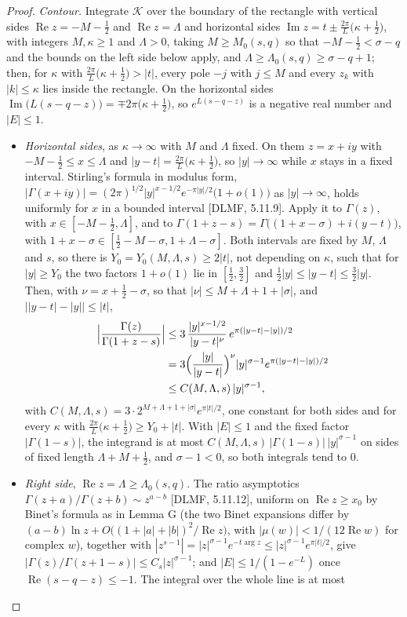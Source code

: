 \documentclass[11pt]{article}
\newcommand{\re}{\operatorname{Re}}
\newcommand{\im}{\operatorname{Im}}
\begin{document}
\begin{proof}
\emph{Contour.} Integrate $\mathcal{K}$ over the boundary of the rectangle with vertical sides $\re z=-M-\frac12$ and $\re z=\Lambda$ and horizontal sides $\im z=t\pm\frac{2\pi}{L}\bigl(\kappa+\frac12\bigr)$, with integers $M,\kappa\ge1$ and $\Lambda>0$, taking $M\ge M_0(s,q)$ so that $-M-\frac12<\sigma-q$ and the bounds on the left side below apply, and $\Lambda\ge\Lambda_0(s,q)\ge\sigma-q+1$; then, for $\kappa$ with $\frac{2\pi}{L}\bigl(\kappa+\frac12\bigr)>|t|$, every pole $-j$ with $j\le M$ and every $z_k$ with $|k|\le\kappa$ lies inside the rectangle. On the horizontal sides $\im\bigl(L(s-q-z)\bigr)=\mp2\pi\bigl(\kappa+\frac12\bigr)$, so $e^{L(s-q-z)}$ is a negative real number and $|E|\le1$.
\begin{itemize}
\item \emph{Horizontal sides}, as $\kappa\to\infty$ with $M$ and $\Lambda$ fixed. On them $z=x+iy$ with $-M-\frac12\le x\le\Lambda$ and $|y-t|=\frac{2\pi}{L}\bigl(\kappa+\frac12\bigr)$, so $|y|\to\infty$ while $x$ stays in a fixed interval. Stirling's formula in modulus form, $|\Gamma(x+iy)|=(2\pi)^{1/2}|y|^{x-1/2}e^{-\pi|y|/2}\bigl(1+o(1)\bigr)$ as $|y|\to\infty$, holds uniformly for $x$ in a bounded interval [DLMF, 5.11.9]. Apply it to $\Gamma(z)$, with $x\in[-M-\frac12,\Lambda]$, and to $\Gamma(1+z-s)=\Gamma\bigl((1+x-\sigma)+i(y-t)\bigr)$, with $1+x-\sigma\in[\frac12-M-\sigma,1+\Lambda-\sigma]$. Both intervals are fixed by $M$, $\Lambda$ and $s$, so there is $Y_0=Y_0(M,\Lambda,s)\ge2|t|$, not depending on $\kappa$, such that for $|y|\ge Y_0$ the two factors $1+o(1)$ lie in $[\frac12,\frac32]$ and $\frac12|y|\le|y-t|\le\frac32|y|$. Then, with $\nu=x+\frac12-\sigma$, so that $|\nu|\le M+\Lambda+1+|\sigma|$, and $\bigl||y-t|-|y|\bigr|\le|t|$,
\begin{align*}
\Bigl|\frac{\Gamma(z)}{\Gamma(1+z-s)}\Bigr|&\le3\,\frac{|y|^{x-1/2}}{|y-t|^{\nu}}\,e^{\pi(|y-t|-|y|)/2}\\
&=3\Bigl(\frac{|y|}{|y-t|}\Bigr)^{\nu}|y|^{\sigma-1}e^{\pi(|y-t|-|y|)/2}\\
&\le C(M,\Lambda,s)\,|y|^{\sigma-1},
\end{align*}
with $C(M,\Lambda,s)=3\cdot2^{M+\Lambda+1+|\sigma|}e^{\pi|t|/2}$, one constant for both sides and for every $\kappa$ with $\frac{2\pi}{L}\bigl(\kappa+\frac12\bigr)\ge Y_0+|t|$. With $|E|\le1$ and the fixed factor $|\Gamma(1-s)|$, the integrand is at most $C(M,\Lambda,s)\,|\Gamma(1-s)|\,|y|^{\sigma-1}$ on sides of fixed length $\Lambda+M+\frac12$, and $\sigma-1<0$, so both integrals tend to $0$.
\item \emph{Right side}, $\re z=\Lambda\ge\Lambda_0(s,q)$. The ratio asymptotics $\Gamma(z+a)/\Gamma(z+b)\sim z^{a-b}$ [DLMF, 5.11.12], uniform on $\re z\ge x_0$ by Binet's formula as in Lemma G (the two Binet expansions differ by $(a-b)\ln z+O\bigl((1+|a|+|b|)^2/\re z\bigr)$, with $|\mu(w)|<1/(12\re w)$ for complex $w$), together with $|z^{s-1}|=|z|^{\sigma-1}e^{-t\arg z}\le|z|^{\sigma-1}e^{\pi|t|/2}$, give $|\Gamma(z)/\Gamma(z+1-s)|\le C_s|z|^{\sigma-1}$; and $|E|\le1/(1-e^{-L})$ once $\re(s-q-z)\le-1$. The integral over the whole line is at most

\end{itemize}
\end{proof}
\end{document}
